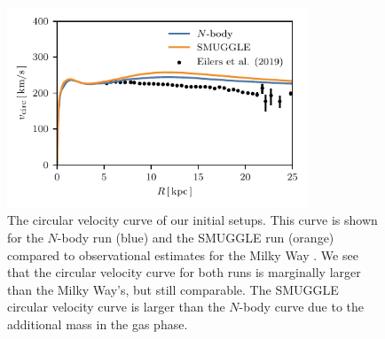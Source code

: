 \documentclass[fleqn,usenatbib]{mnras}
\newcommand{\Nbody}{$N$-body}
\begin{document}
\begin{figure}
    \centering
    \includegraphics[width=9cm]{fig/vcirc.pdf}
    \caption{The circular velocity curve of our initial setups. This
    curve is shown for the \Nbody{} run (blue) and the SMUGGLE run (orange)
    compared to observational estimates for the Milky
    Way \citep{2019ApJ...871..120E}. We see that the circular velocity curve for
    both runs is marginally larger than the Milky Way's, but still comparable. The
    SMUGGLE circular velocity curve is larger than the \Nbody{} curve due to the
    additional mass in the gas phase.}
    \label{fig:vcirc}
\end{figure}



\bsp	%
\label{lastpage}
\end{document}
